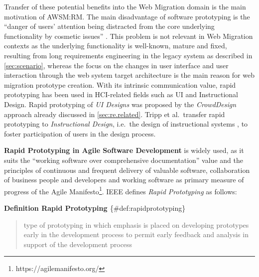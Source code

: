 Transfer of these potential benefits into the Web Migration domain is the main motivation of AWSM:RM.
The main disadvantage of software prototyping is the ``danger of users' attention being distracted from the core underlying functionality by cosmetic issues'' \autocite{SWEBOK2014}.
This problem is not relevant in Web Migration contexts as the underlying functionality is well-known, mature and fixed, resulting from long requirements engineering in the legacy system as described in \cref{sec:scenario}, whereas the focus on the changes in user interface and user interaction through the web system target architecture is the main reason for web migration prototype creation.
With its intrinsic communication value, rapid prototyping has been used in HCI-related fields such as UI and Instructional Design.
Rapid prototyping of \emph{UI Designs} was proposed by the \emph{CrowdDesign} approach \autocite{Nebeling2012} already discussed in \cref{sec:re.related}.
Tripp et al.~transfer rapid prototyping to \emph{Instructional Design}, i.e.~the design of instructional systems \autocite{Tripp1990}, to foster participation of users in the design process.

\textbf{Rapid Prototyping in Agile Software Development} is widely used, as it suits the ``working software over comprehensive documentation'' value \autocite{Fowler2001} and the principles of continuous and frequent delivery of valuable software, collaboration of business people and developers and working software as primary measure of progress of the Agile Manifesto\footnote{https://agilemanifesto.org/}.
IEEE defines \emph{Rapid Prototyping} as follows:

\textbf{Definition Rapid Prototyping \autocite{ISO/IEEE24765Vocabulary}} \{\#def:rapidprototyping\}

\begin{quote}
type of prototyping in which emphasis is placed on developing prototypes early in the development process to permit early feedback and analysis in support of the development process
\end{quote}

